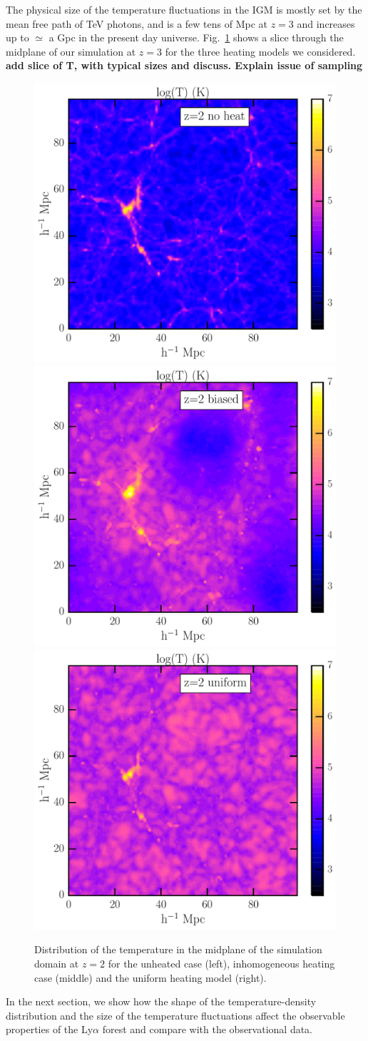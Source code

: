 \documentclass[numberedappendix]{emulateapj}
\newcommand\ALc[1]{{\color{red} \bf #1}} %
\begin{document}
The physical size of the temperature fluctuations in the IGM is mostly set by the mean free path of TeV photons, and is a few tens of Mpc at $z=3$ and increases up to $\simeq$ a Gpc in the present day universe. Fig.~\ref{fig:T_flucs} shows a slice through the midplane of our simulation at $z=3$ for the three heating models we considered. 
\ALc{add slice of T, with typical sizes and discuss. Explain issue of sampling}

\begin{figure}
\centering
\includegraphics[width = .3\textwidth ]{T_map_z2_noheat.pdf}
\includegraphics[width = .3\textwidth ]{T_map_z2_qso.pdf}
\includegraphics[width = .3\textwidth ]{T_map_z2_uniform.pdf}
\caption{Distribution of the temperature in the midplane of the simulation domain at $z=2$ for the unheated case (left), inhomogeneous heating case (middle) and the uniform heating model (right).}
\label{fig:T_flucs}
\end{figure}


In the next section, we show how the shape of the temperature-density distribution and the size of the temperature fluctuations affect the observable properties of the Ly$\alpha$ forest and compare with the observational data.
\end{document}
